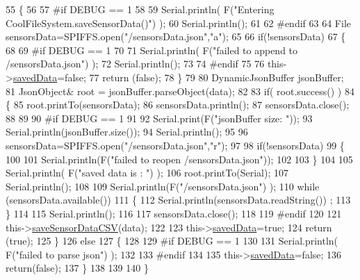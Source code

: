 \begin{DoxyCode}
55 \{
56 
57 \textcolor{preprocessor}{#if DEBUG == 1}
58 
59     Serial.println( F(\textcolor{stringliteral}{"Entering CoolFileSystem.saveSensorData()"}) );
60     Serial.println();
61 
62 \textcolor{preprocessor}{#endif}
63     
64     File sensorsData=SPIFFS.open(\textcolor{stringliteral}{"/sensorsData.json"},\textcolor{stringliteral}{"a"});
65 
66     \textcolor{keywordflow}{if}(!sensorsData)
67     \{
68     
69 \textcolor{preprocessor}{    #if DEBUG == 1}
70     
71         Serial.println( F(\textcolor{stringliteral}{"failed to append to /sensorsData.json"}) );
72         Serial.println();
73     
74 \textcolor{preprocessor}{    #endif}
75 
76         this->\hyperlink{class_cool_file_system_ad398e0c5c41a0c88acdf5d672aa71351}{savedData}=\textcolor{keyword}{false};
77         \textcolor{keywordflow}{return} (\textcolor{keyword}{false}); 
78     \}   
79 
80     DynamicJsonBuffer jsonBuffer;
81     JsonObject& root = jsonBuffer.parseObject(data);
82 
83     \textcolor{keywordflow}{if}( root.success() )
84     \{
85         root.printTo(sensorsData);
86         sensorsData.println();
87         sensorsData.close();
88 
89 
90 \textcolor{preprocessor}{    #if DEBUG == 1}
91         
92         Serial.print(F(\textcolor{stringliteral}{"jsonBuffer size: "}));
93         Serial.println(jsonBuffer.size());
94         Serial.println();
95 
96         sensorsData=SPIFFS.open(\textcolor{stringliteral}{"/sensorsData.json"},\textcolor{stringliteral}{"r"});
97         
98         \textcolor{keywordflow}{if}(!sensorsData)
99         \{
100             
101             Serial.println(F(\textcolor{stringliteral}{"failed to reopen /sensorsData.json"}));
102                         
103         \}
104     
105         Serial.println( F(\textcolor{stringliteral}{"saved data is : "}) );
106         root.printTo(Serial);
107         Serial.println();
108 
109         Serial.println(F(\textcolor{stringliteral}{"/sensorsData.json"}) );
110         \textcolor{keywordflow}{while} (sensorsData.available()) 
111         \{
112             Serial.println(sensorsData.readString()) ;
113         \}
114         
115         Serial.println();
116         
117         sensorsData.close();
118     
119 \textcolor{preprocessor}{    #endif}
120 
121         this->\hyperlink{class_cool_file_system_ab78704d5d21ce10fc6f1138ab5ab46c8}{saveSensorDataCSV}(data);     
122 
123         this->\hyperlink{class_cool_file_system_ad398e0c5c41a0c88acdf5d672aa71351}{savedData}=\textcolor{keyword}{true};
124         \textcolor{keywordflow}{return} (\textcolor{keyword}{true});      
125     \}
126     \textcolor{keywordflow}{else}
127     \{
128     
129 \textcolor{preprocessor}{    #if DEBUG == 1}
130 
131         Serial.println( F(\textcolor{stringliteral}{"failed to parse json"}) );
132     
133 \textcolor{preprocessor}{    #endif}
134 
135         this->\hyperlink{class_cool_file_system_ad398e0c5c41a0c88acdf5d672aa71351}{savedData}=\textcolor{keyword}{false};
136         \textcolor{keywordflow}{return}(\textcolor{keyword}{false});
137     \}
138     
139 
140 \}
\end{DoxyCode}
